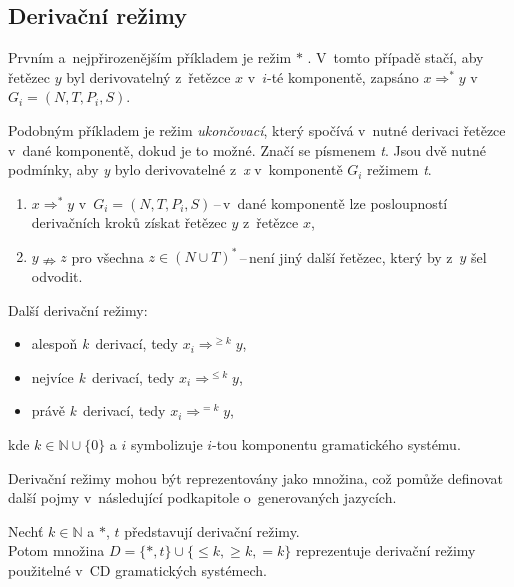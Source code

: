 \subsection*{Derivační režimy}\label{4_1_x_derivacni_rezimy}

Prvním a~nejpřirozenějším příkladem je režim $*$ . V~tomto případě stačí, aby řetězec $y$ byl derivovatelný z~řetězce $x$ v~$i$-té komponentě, zapsáno $x\Rightarrow^{*}y$ v~$G_i = (N,T,P_i,S)$.

Podobným příkladem je režim \emph{ukončovací}, který spočívá v~nutné derivaci řetězce v~dané komponentě, dokud je to možné. Značí se písmenem \emph{t}. Jsou dvě nutné podmínky, aby \emph{y} bylo derivovatelné z~\emph{x} v~komponentě $G_i$ režimem \emph{t}.
\begin{enumerate}
    \item $x \Rightarrow^{*} y$ v~$G_i = (N,T,P_i,S)$\,--\,v~dané komponentě lze posloupností derivačních kroků získat řetězec $y$ z~řetězce $x$,
    \item $y \nRightarrow z$ pro všechna $z \in (N \cup T)^{*}$\,--\,není jiný další řetězec, který by z~$y$ šel odvodit.
\end{enumerate}

Další derivační režimy:
\begin{itemize}
    \item alespoň \emph{k}~derivací, tedy $x_i \Rightarrow^{\geq k} y$,
    \item nejvíce \emph{k}~derivací, tedy $x_i \Rightarrow^{\leq k} y$,
    \item právě \emph{k}~derivací, tedy $x_i \Rightarrow^{=k} y$,
\end{itemize}
kde $k \in \mathbb{N} \cup \{0\}$ a $i$ symbolizuje $i$-tou komponentu gramatického systému.

Derivační režimy mohou být reprezentovány jako množina, což pomůže definovat další pojmy v~následující podkapitole o~generovaných jazycích.
\begin{definition}\label{def_der_rezimy}
    Nechť $k\in \mathbb{N}$ a $*$, $t$ představují derivační režimy. \\
    Potom množina $D = \{*, t\} \cup \{\leq k, \geq k, =k\}$ reprezentuje derivační režimy použitelné v~CD gramatických systémech.
\end{definition}

